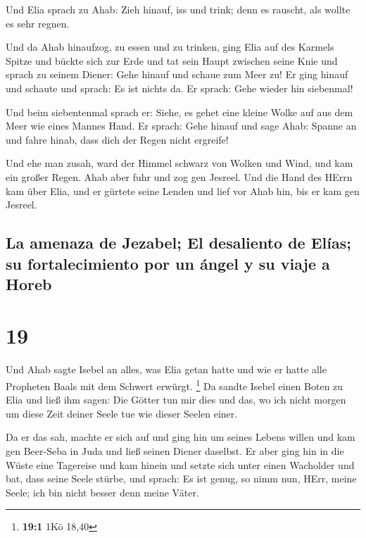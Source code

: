  Und Elia sprach zu Ahab: Zieh hinauf, iss und trink;
denn es rauscht, als wollte es sehr regnen.

 Und da Ahab hinaufzog, zu essen und zu trinken, ging
Elia auf des Karmels Spitze und bückte sich zur Erde und tat sein Haupt
zwischen seine Knie  und sprach zu seinem Diener: Gehe
hinauf und schaue zum Meer zu! Er ging hinauf und schaute und sprach: Es
ist nichts da. Er sprach: Gehe wieder hin siebenmal!

 Und beim siebentenmal sprach er: Siehe, es gehet eine
kleine Wolke auf aus dem Meer wie eines Mannes Hand. Er sprach: Gehe
hinauf und sage Ahab: Spanne an und fahre hinab, dass dich der Regen
nicht ergreife!

 Und ehe man zusah, ward der Himmel schwarz von Wolken
und Wind, und kam ein großer Regen. Ahab aber fuhr und zog gen Jesreel.
 Und die Hand des HErrn kam über Elia, und er gürtete
seine Lenden und lief vor Ahab hin, bis er kam gen Jesreel.

\hypertarget{la-amenaza-de-jezabel-el-desaliento-de-eluxedas-su-fortalecimiento-por-un-uxe1ngel-y-su-viaje-a-horeb}{%
\subsection{La amenaza de Jezabel; El desaliento de Elías; su
fortalecimiento por un ángel y su viaje a
Horeb}\label{la-amenaza-de-jezabel-el-desaliento-de-eluxedas-su-fortalecimiento-por-un-uxe1ngel-y-su-viaje-a-horeb}}

\hypertarget{section-18}{%
\section{19}\label{section-18}}

 Und Ahab sagte Isebel an alles, was Elia getan hatte und
wie er hatte alle Propheten Baals mit dem Schwert erwürgt. \footnote{\textbf{19:1}
  1Kö 18,40}  Da sandte Isebel einen Boten zu Elia und
ließ ihm sagen: Die Götter tun mir dies und das, wo ich nicht morgen um
diese Zeit deiner Seele tue wie dieser Seelen einer.

 Da er das sah, machte er sich auf und ging hin um seines
Lebens willen und kam gen Beer-Seba in Juda und ließ seinen Diener
daselbst.  Er aber ging hin in die Wüste eine Tagereise
und kam hinein und setzte sich unter einen Wacholder und bat, dass seine
Seele stürbe, und sprach: Es ist genug, so nimm nun, HErr, meine Seele;
ich bin nicht besser denn meine Väter.

